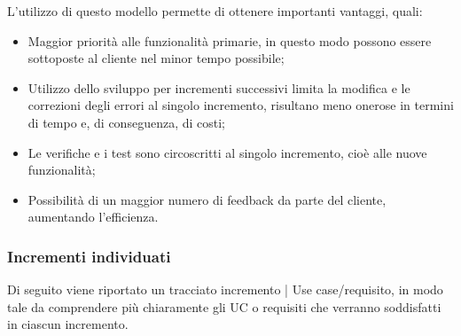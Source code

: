 \documentclass[../piano_di_progetto.tex]{subfiles}
\begin{document}
L'utilizzo di questo modello permette di ottenere importanti vantaggi, quali:
\begin{itemize}
    \item Maggior priorità alle funzionalità primarie, in questo modo possono essere sottoposte al cliente nel minor tempo possibile;
    \item Utilizzo dello sviluppo per incrementi successivi limita la modifica e le correzioni degli errori al singolo incremento, risultano meno onerose in termini di tempo e, di conseguenza, di costi;
    \item Le verifiche e i test sono circoscritti al singolo incremento, cioè alle nuove funzionalità;
    \item Possibilità di un maggior numero di feedback da parte del cliente, aumentando l'efficienza.
\end{itemize}

\subsubsection{Incrementi individuati}
\label{ssub:incr_ind}

Di seguito viene riportato un tracciato incremento | Use case/requisito, in modo tale da comprendere più chiaramente gli UC o requisiti che verranno soddisfatti in ciascun incremento. 
\end{document}

